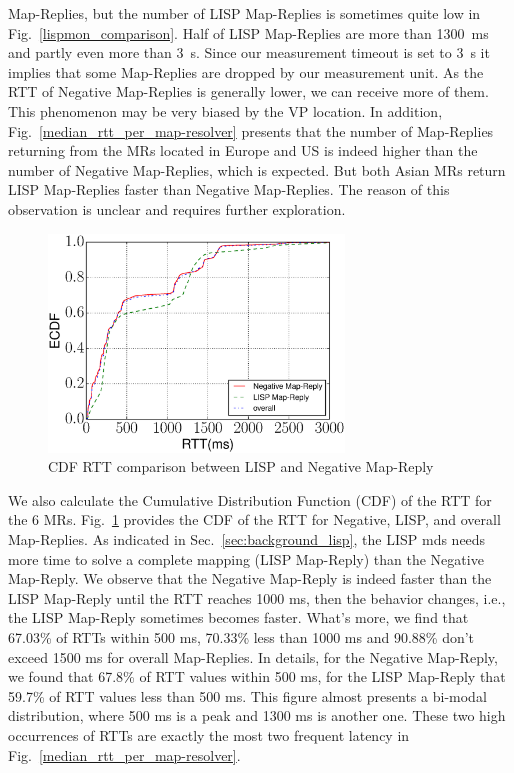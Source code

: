 Map-Replies, but the number of LISP Map-Replies is sometimes quite low in
Fig.~\ref{lispmon_comparison}. Half of LISP Map-Replies are more than 1300~ms
and partly even more than 3~s. Since our measurement timeout is set to 3~s
it implies that some Map-Replies are dropped by our measurement unit.  As the
RTT of Negative Map-Replies is generally lower, we can receive more of them. This
phenomenon may be very biased by the VP location. %
In addition, Fig.~\ref{median_rtt_per_map-resolver} presents that the number of
Map-Replies returning from the MRs  located in Europe and US is indeed higher
than the number of Negative Map-Replies, which is expected. But both Asian MRs
return LISP Map-Replies faster than Negative Map-Replies. The reason of this 
observation is unclear and requires further exploration.

\begin{figure}[!t]
        \centering
        \includegraphics[width=0.7\textwidth]{Pics/ecdf_of_RTT.eps}
        \caption{CDF RTT comparison between LISP and Negative Map-Reply}
        \label{ecdf_rtt_lisp_negative}
\end{figure}
We also calculate the Cumulative Distribution Function (CDF) of the
RTT for the 6 MRs. Fig.~\ref{ecdf_rtt_lisp_negative} provides the CDF of the
RTT for Negative, LISP, and overall Map-Replies. As indicated in
Sec.~\ref{sec:background_lisp}, the LISP \acrshort{mds} needs more time to solve a
complete mapping (LISP Map-Reply) than the Negative Map-Reply.  We observe that
the Negative Map-Reply is indeed faster than the LISP Map-Reply until the RTT
reaches 1000 ms, then the behavior changes, i.e., the LISP Map-Reply
sometimes becomes faster. What's more, we find that 67.03\% of RTTs within
500 ms, 70.33\% less than 1000 ms and 90.88\% don't exceed 1500 ms
for overall Map-Replies. In details, for the Negative Map-Reply, we found that
67.8\% of RTT values within 500 ms, for the LISP Map-Reply that 59.7\% of
RTT values less than 500 ms. This figure almost presents a bi-modal
distribution, where 500 ms is a peak and 1300 ms is another one. These two
high occurrences of RTTs are exactly the most two frequent latency in
Fig.~\ref{median_rtt_per_map-resolver}.


